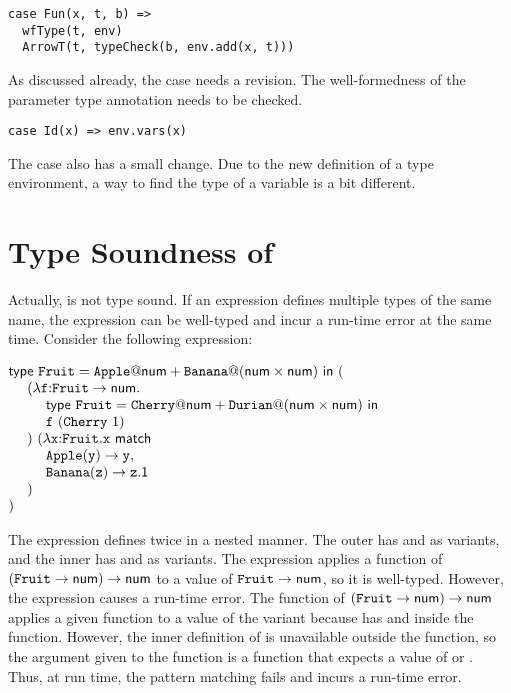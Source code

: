 \begin{verbatim}
case Fun(x, t, b) =>
  wfType(t, env)
  ArrowT(t, typeCheck(b, env.add(x, t)))
\end{verbatim}

As discussed already, the  case needs a revision.
The well-formedness of the parameter type annotation needs to be checked.

\begin{verbatim}
case Id(x) => env.vars(x)
\end{verbatim}

The  case also has a small change. Due to the new definition of a type
environment, a way to find the type of a variable is a bit different.

\section{Type Soundness of \lang}

Actually, \lang is not type sound. If an expression defines multiple types of
the same name, the expression can be well-typed and incur a run-time error at the
same time. Consider the following expression:

\vspace{0.5em}
$\begin{array}{@{}l}
  \etdef{\code{Fruit}}{\code{Apple}}{\tnum}{\code{Banana}}{(\tnum\times\tnum)}{( \\
  \ \ \ \ (\efunt{\cf}{\tarrow{\code{Fruit}}{\tnum}}{ \\
  \ \ \ \ \ \ \ \ \etdef{\code{Fruit}}{\code{Cherry}}{\tnum}{\code{Durian}}{(\tnum\times\tnum)}{ \\
  \ \ \ \ \ \ \ \ \cf\ (\code{Cherry}\ 1)} \\
  \ \ \ \ })\ (\efunt{\cx}{\code{Fruit}}{\ematch{\cx}{ \\
  \ \ \ \ \ \ \ \ \code{Apple}}{\cy}{\cy}{ \\
  \ \ \ \ \ \ \ \ \code{Banana}}{\cz}{\cz\textsf{.1}}} \\
  \ \ \ \ ) \\
  )}
\end{array}$
\vspace{0.5em}

The expression defines  twice in a nested manner. The outer
 has  and  as variants, and the inner
 has  and  as variants. The expression
applies a function of $(\texttt{Fruit}\rightarrow\textsf{num})\rightarrow\textsf{num}$ to a value
of ${\texttt{Fruit}\rightarrow\textsf{num}}$, so it is well-typed. However, the
expression causes a run-time error. The function of
$(\texttt{Fruit}\rightarrow\textsf{num})\rightarrow\textsf{num}$ applies a given function to a
value of the  variant because  has  and
 inside the function. However, the inner definition of
 is unavailable outside the function, so the argument given to the
function is a function that expects a value of  or .
Thus, at run time, the pattern matching fails and incurs a run-time error.

